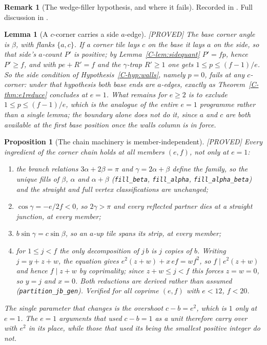 \documentclass[11pt,reqno]{amsart}
\theoremstyle{plain}
\newtheorem{lemma}[theorem]{Lemma}
\newtheorem{proposition}[theorem]{Proposition}
\theoremstyle{definition}
\newtheorem{remark}[theorem]{Remark}
\newcommand{\lab}[1]{\hfill\textnormal{\footnotesize\textsc{[#1]}}}
\begin{document}
\begin{remark}[The wedge-filler hypothesis, and where it fails]\label{rem:alphamin}
Recorded in \cite{Obstructions}. Full discussion in \cite{Obstructions}.
\end{remark}

\begin{lemma}[A $c$-corner carries a side $a$-edge]\label{lem:ccornerside}\lab{PROVED}
The base corner angle is $\beta$, with flanks $\{a,c\}$. If a corner tile lays $c$ on the base it
lays $a$ on the side, so that side's $a$-count $P'$ is positive; by Lemma~\ref{C-lem:sidequant}
$P'=fp$, hence $P'\ge f$, and with $p e+R'=f$ and the $\gamma$-trap $R'\ge1$ one gets
$1\le p\le(f-1)/e$. So the side condition of Hypothesis~\ref{C-hyp:walls}, namely $p=0$, fails at
any $c$-corner: under that hypothesis both base ends are $a$-edges, exactly as
Theorem~\ref{C-thm:e1reduce} concludes at $e=1$. What remains for $e\ge2$ is to exclude
$1\le p\le(f-1)/e$, which is the analogue of the entire $e=1$ programme rather than a single
lemma; the boundary alone does not do it, since $a$ and $c$ are both available at the first base
position once the walls column is in force.
\end{lemma}

\begin{proposition}[The chain machinery is member-independent]\label{prop:unify}\lab{PROVED}
Every ingredient of the corner chain holds at all members $(e,f)$, not only at $e=1$:
\begin{enumerate}
\item[\textup{(i)}] the branch relations $3\alpha+2\beta=\pi$ and $\gamma=2\alpha+\beta$ define
the family, so the unique fills of $\beta$, $\alpha$ and $\alpha+\beta$ (\texttt{fill\_beta},
\texttt{fill\_alpha}, \texttt{fill\_alpha\_beta}) and the straight and full vertex
classifications are unchanged;
\item[\textup{(ii)}] $\cos\gamma=-e/2f<0$, so $2\gamma>\pi$ and every reflected partner dies at a
straight junction, at every member;
\item[\textup{(iii)}] $b\sin\gamma=c\sin\beta$, so an $a$-up tile spans its strip, at every member;
\item[\textup{(iv)}] for $1\le j<f$ the only decomposition of $j\,b$ is $j$ copies of $b$. Writing
$j=y+z+w$, the equation gives $e^2(z+w)+x\,ef=w f^2$, so $f\mid e^2(z+w)$ and hence
$f\mid z+w$ by coprimality; since $z+w\le j<f$ this forces $z=w=0$, so $y=j$ and $x=0$. Both
reductions are derived rather than assumed (\texttt{partition\_jb\_gen}). Verified for all
coprime $(e,f)$ with $e<12$, $f<20$.
\end{enumerate}
The single parameter that changes is the overshoot $c-b=e^2$, which is $1$ only at $e=1$. The
$e=1$ arguments that used $c-b=1$ as a unit therefore carry over with $e^2$ in its place, while
those that used its being the smallest positive integer do not.
\end{proposition}
\end{document}
